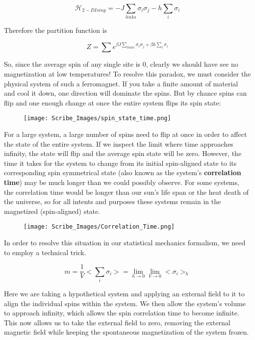 \documentclass{article}
\newcommand{\sigi}{\sigma_{i}}
\newcommand{\sigj}{\sigma_{j}}
\begin{document}
$$\mathcal{H}_{2-D Ising}=-J\sum_{links}\sigma_{i}\sigma_{j}-h\sum_{i}\sigma_{i}$$

Therefore the partition function is 

$$Z=\sum e^{\beta J\sum_{links}\sigi\sigj+\beta h\sum_{i}\sigi}$$


So, since the average spin of any single site is 0, clearly we should have see no magnetization at low temperatures!  To resolve this paradox, we must consider the physical system of such a ferromagnet.  If you take a finite amount of material and cool it down, one direction will dominate the spins.  But by chance spins can flip and one enough change at once the entire system flips its spin state:

\begin{figure}
	\texttt{[image: Scribe\_Images/spin\_state\_time.png]}
\end{figure}

For a large system, a large number of spins need to flip at once in order to affect the state of the entire system.  If we inspect the limit where time approaches infinity, the state will flip and the average spin state will be zero.  However, the time it takes for the system to change from its initial spin-aligned state to its corresponding spin symmetrical state (also known as the system's \textbf{correlation time}) may be much longer than we could possibly observe.  For some systems, the correlation time would be longer than our sun's life span or the heat death of the universe, so for all intents and purposes these systems remain in the magnetized (spin-aligned) state.

\begin{figure}
	\texttt{[image: Scribe\_Images/Correlation\_Time.png]}
\end{figure}

In order to resolve this situation in our statistical mechanics formalism, we need to employ a technical trick.  

$$m=\frac{1}{V}<\sum_{i}\sigi>=\lim\limits_{h\rightarrow0}\lim\limits_{V\rightarrow0}<\sigi>_{h}$$

Here we are taking a hypothetical system and applying an external field to it to align the individual spins within the system.  We then allow the system's volume to approach infinity, which allows the spin correlation time to become infinite.  This now allows us to take the external field to zero, removing the external magnetic field while keeping the spontaneous magnetization of the system frozen.  
\end{document}
